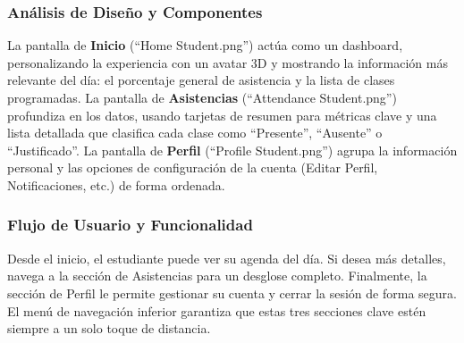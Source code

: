 \begin{samepage}
	\subsubsection*{Análisis de Diseño y Componentes}
	La pantalla de \textbf{Inicio} (``Home Student.png'') actúa como un dashboard, personalizando la experiencia con un avatar 3D y mostrando la información más relevante del día: el porcentaje general de asistencia y la lista de clases programadas. La pantalla de \textbf{Asistencias} (``Attendance Student.png'') profundiza en los datos, usando tarjetas de resumen para métricas clave y una lista detallada que clasifica cada clase como ``Presente'', ``Ausente'' o ``Justificado''. La pantalla de \textbf{Perfil} (``Profile Student.png'') agrupa la información personal y las opciones de configuración de la cuenta (Editar Perfil, Notificaciones, etc.) de forma ordenada.
    
	\subsubsection*{Flujo de Usuario y Funcionalidad}
	Desde el inicio, el estudiante puede ver su agenda del día. Si desea más detalles, navega a la sección de Asistencias para un desglose completo. Finalmente, la sección de Perfil le permite gestionar su cuenta y cerrar la sesión de forma segura. El menú de navegación inferior garantiza que estas tres secciones clave estén siempre a un solo toque de distancia.
\normalsize\end{samepage}
\clearpage

